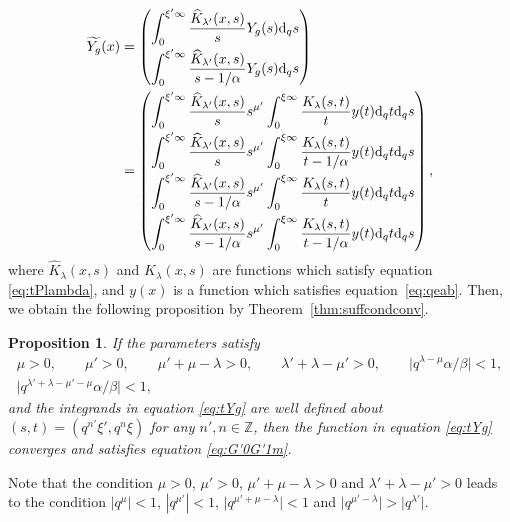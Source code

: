 \documentclass[pdftex]{sigma}
\numberwithin{equation}{section}
\newtheorem{Proposition}[Theorem]{Proposition}
\theoremstyle{definition}
\begin{document}
\begin{align}
\widetilde{Y_g}(x)
& = \begin{pmatrix}
 \displaystyle \int_0^{\xi' \infty} \frac{\widehat{K}_{\lambda'}(x,s)}{s} Y_g (s) {\rm d}_q s \vspace{1mm}\\
 \displaystyle \int_0^{\xi' \infty} \frac{\widehat{K}_{\lambda'}(x,s)}{s - 1/\alpha} Y_g (s) {\rm d}_q s
 \end{pmatrix} \nonumber \\
& = \begin{pmatrix}
 \displaystyle \int_0^{\xi' \infty} \frac{\widehat{K}_{\lambda'}(x,s)}{s} s^{\mu' } \int_0^{\xi \infty} \frac{K_{\lambda}(s,t)}{t} y(t) {\rm d}_q t {\rm d}_q s \vspace{1mm}\\
 \displaystyle \int_0^{\xi' \infty} \frac{\widehat{K}_{\lambda'}(x,s)}{s} s^{\mu' } \int_0^{\xi \infty} \frac{K_{\lambda}(s,t)}{t - 1/\alpha} y(t) {\rm d}_q t {\rm d}_q s \vspace{1mm}\\
 \displaystyle \int_0^{\xi' \infty} \frac{\widehat{K}_{\lambda'}(x,s)}{s - 1/\alpha} s^{\mu' } \int_0^{\xi \infty} \frac{K_{\lambda}(s,t)}{t} y(t) {\rm d}_q t {\rm d}_q s \vspace{1mm}\\
 \displaystyle \int_0^{\xi' \infty} \frac{\widehat{K}_{\lambda'}(x,s)}{s - 1/\alpha} s^{\mu' } \int_0^{\xi \infty} \frac{K_{\lambda}(s,t)}{t - 1/\alpha} y(t) {\rm d}_q t {\rm d}_q s
 \end{pmatrix} , \label{eq:tYg}
\end{align}
where $\widehat{K}_{\lambda }(x,s) $ and $K_{\lambda }(x,s)$ are functions which satisfy equation \eqref{eq:tPlambda}, and $y(x)$ is a function which satisfies equation~\eqref{eq:qeab}.
Then, we obtain the following proposition by Theorem~\ref{thm:suffcondconv}.
\begin{Proposition} \label{prop:ghge3conv}
If the parameters satisfy
\begin{gather}
 \mu >0, \qquad \mu ' >0, \qquad \mu ' +\mu -\lambda >0 , \qquad \lambda ' + \lambda - \mu' >0 ,\qquad \big|q^{\lambda - \mu} \alpha /\beta \big|<1 , \nonumber\\ \big|q^{\lambda '+ \lambda - \mu ' - \mu} \alpha /\beta \big|<1,\label{eq:prop41}
\end{gather}
and the integrands in equation \eqref{eq:tYg} are well defined about $(s,t) = (q^{n'} \xi ', q^n \xi )$ for any $n', n \in \mathbb{Z} $, then the function  in equation \eqref{eq:tYg} converges and satisfies equation \eqref{eq:G'0G'1m}.
\end{Proposition}
Note that the condition $\mu >0$, $\mu ' >0$, $\mu ' +\mu -\lambda >0$ and $\lambda ' + \lambda - \mu' >0$ leads to the condition $|q^{\mu } |<1$, $|q^{\mu '} |<1$, $\big|q^{\mu ' +\mu -\lambda } \big|<1$ and $ \big|q^{ \mu ' - \lambda } \big| > \big|q^{\lambda '} \big| $.
\end{document}
